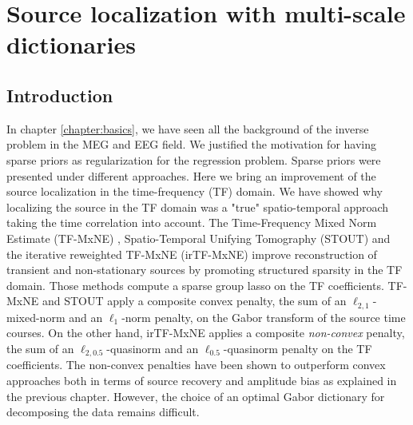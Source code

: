 
\chapter{Source localization with multi-scale dictionaries} %

\label{chapter:multiscale} %

\section{Introduction}
In chapter \ref{chapter:basics}, we have seen all the background of the inverse problem in the MEG and EEG field. We justified the motivation for having sparse priors as regularization for the regression problem. Sparse priors were presented under different approaches. Here we bring an improvement of the source localization in the time-frequency (TF) domain. We have showed why localizing the source in the TF domain was a "true" spatio-temporal approach taking the time correlation into account.
The Time-Frequency Mixed Norm Estimate (TF-MxNE) \cite{Alex13}, Spatio-Temporal Unifying Tomography (STOUT) \cite{castano2015solving} and the iterative reweighted TF-MxNE (irTF-MxNE) \cite{daniel15} improve reconstruction of transient and non-stationary sources by promoting structured sparsity in the TF domain. Those methods compute a sparse group lasso on the TF coefficients. TF-MxNE and STOUT apply a composite convex penalty, the sum of an $\ell_{2, 1}$-mixed-norm and an $\ell_{1}$-norm penalty, on the Gabor transform of the source time courses. On the other hand, irTF-MxNE applies a composite \emph{non-convex} penalty, the sum of an $\ell_{2, 0.5}$-quasinorm and an $\ell_{0.5}$-quasinorm penalty on the TF coefficients.
The non-convex penalties have been shown to outperform convex approaches both in terms of source recovery and amplitude bias \cite{candes2008enhancing,daubechies2010iteratively} as explained in the previous chapter. However, the choice of an optimal Gabor dictionary for decomposing the data remains difficult.

